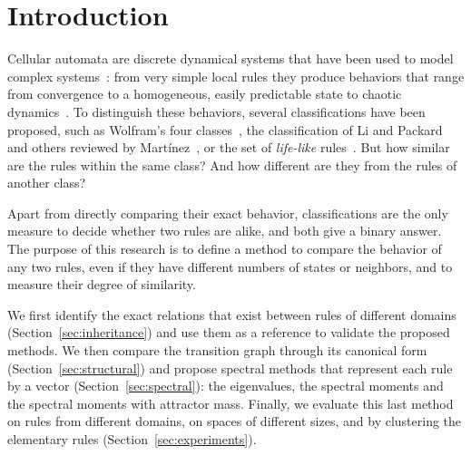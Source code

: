 \section{Introduction}

Cellular automata are discrete dynamical systems that have been used to model complex systems~\cite{Torres2025_complejo,sole1996_cs_caos,Hoekstra2010_cs_ca}: from very simple local rules they produce behaviors that range from convergence to a homogeneous, easily predictable state to chaotic dynamics~\cite{wolfram1982_ca,Wolfram2002_nks}. To distinguish these behaviors, several classifications have been proposed, such as Wolfram's four classes~\cite{Wolfram2002_nks}, the classification of Li and Packard~\cite{li1990_structure} and others reviewed by Martínez~\cite{genaro2013_class}, or the set of \emph{life-like} rules~\cite{lifewiki_life}. But how similar are the rules within the same class? And how different are they from the rules of another class?

Apart from directly comparing their exact behavior, classifications are the only measure to decide whether two rules are alike, and both give a binary answer. The purpose of this research is to define a method to compare the behavior of any two rules, even if they have different numbers of states or neighbors, and to measure their degree of similarity.

We first identify the exact relations that exist between rules of different domains (Section~\ref{sec:inheritance}) and use them as a reference to validate the proposed methods. We then compare the transition graph through its canonical form (Section~\ref{sec:structural}) and propose spectral methods that represent each rule by a vector (Section~\ref{sec:spectral}): the eigenvalues, the spectral moments and the spectral moments with attractor mass. Finally, we evaluate this last method on rules from different domains, on spaces of different sizes, and by clustering the elementary rules (Section~\ref{sec:experiments}).

